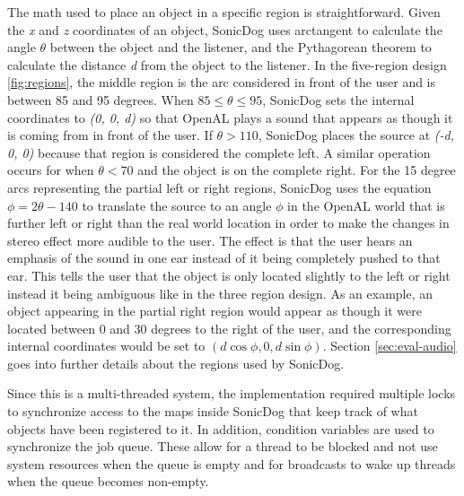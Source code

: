 The math used to place an object in a specific region is straightforward. Given
the \emph{x} and \emph{z} coordinates of an object, SonicDog uses arctangent to
calculate the angle \begin{math}\theta\end{math} between the object and the
listener, and the Pythagorean theorem to calculate the distance \emph{d} from
the object to the listener. In the five-region design \ref{fig:regions}, the
middle region is the arc considered in front of the user and is between 85 and
95 degrees. When \begin{math}85\leq\theta\leq95\end{math}, SonicDog sets the
internal coordinates to \emph{(0, 0, d)} so that OpenAL plays a sound that
appears as though it is coming from in front of the user. If
\begin{math}\theta>110\end{math}, SonicDog places the source at \emph{(-d, 0,
0)} because that region is considered the complete left. A similar operation
occurs for when \begin{math}\theta<70\end{math} and the object is on the
complete right. For the 15 degree arcs representing the partial left or right
regions, SonicDog uses the equation \begin{math}\phi=2\theta-140\end{math} to
translate the source to an angle \begin{math}\phi\end{math} in the OpenAL world
that is further left or right than the real world location in order to make the
changes in stereo effect more audible to the user. The effect is that the user
hears an emphasis of the sound in one ear instead of it being completely pushed
to that ear. This tells the user that the object is only located slightly to the
left or right instead it being ambiguous like in the three region design. As an
example, an object appearing in the partial right region would appear as though
it were located between 0 and 30 degrees to the right of the user, and the
corresponding internal coordinates would be set to \begin{math}(d\cos\phi, 0,
d\sin\phi)\end{math}. Section \ref{sec:eval-audio} goes into further details
about the regions used by SonicDog.

Since this is a multi-threaded system, the implementation required multiple
locks to synchronize access to the maps inside SonicDog that keep track of what
objects have been registered to it. In addition, condition variables are used to
synchronize the job queue. These allow for a thread to be blocked and not use 
system resources when the queue is empty and for broadcasts to wake up threads 
when the queue becomes non-empty.
